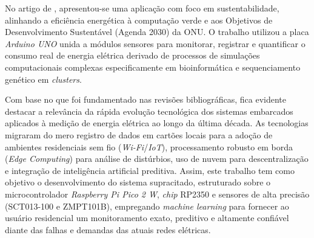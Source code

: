 No artigo de , apresentou-se uma aplicação com foco em sustentabilidade, alinhando a eficiência energética à computação verde e aos Objetivos de Desenvolvimento Sustentável (Agenda 2030) da ONU. O trabalho utilizou a placa \textit{Arduino UNO} unida a módulos sensores para monitorar, registrar e quantificar o consumo real de energia elétrica derivado de processos de simulações computacionais complexas especificamente em bioinformática e sequenciamento genético em \textit{clusters}.

Com base no que foi fundamentado nas revisões bibliográficas, fica evidente destacar a relevância da rápida evolução tecnológica dos sistemas embarcados aplicados à medição de energia elétrica ao longo da última década. As tecnologias migraram do mero registro de dados em cartões locais para a adoção de ambientes residenciais sem fio (\textit{Wi-Fi}/\textit{IoT}), processamento robusto em borda (\textit{Edge Computing}) para análise de distúrbios, uso de nuvem para descentralização e integração de inteligência artificial preditiva. Assim, este trabalho tem como objetivo o desenvolvimento do sistema supracitado, estruturado sobre o microcontrolador \textit{Raspberry Pi Pico 2 W}, \textit{chip} RP2350 e sensores de alta precisão (SCT013-100 e ZMPT101B), empregando \textit{machine learning} para fornecer ao usuário residencial um monitoramento exato, preditivo e altamente confiável diante das falhas e demandas das atuais redes elétricas.